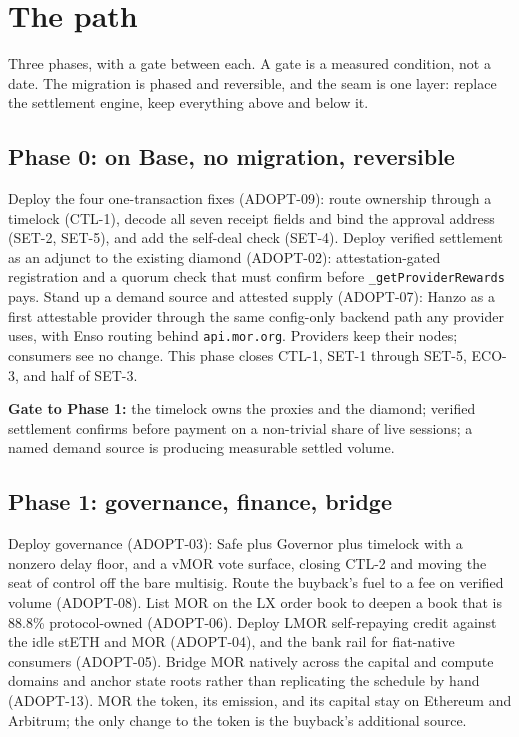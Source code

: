 \documentclass[11pt,a4paper]{article}
\newcommand{\code}[1]{\texttt{\small #1}}
\begin{document}
\section{The path}
\label{sec:path}

Three phases, with a gate between each. A gate is a measured condition, not a date. The
migration is phased and reversible, and the seam is one layer: replace the settlement engine,
keep everything above and below it.

\subsection{Phase 0: on Base, no migration, reversible}

Deploy the four one-transaction fixes (ADOPT-09): route ownership through a timelock (CTL-1),
decode all seven receipt fields and bind the approval address (SET-2, SET-5), and add the
self-deal check (SET-4). Deploy verified settlement as an adjunct to the existing diamond
(ADOPT-02): attestation-gated registration and a quorum check that must confirm before
\code{\_getProviderRewards} pays. Stand up a demand source and attested supply (ADOPT-07): Hanzo
as a first attestable provider through the same config-only backend path any provider uses, with
Enso routing behind \code{api.mor.org}. Providers keep their nodes; consumers see no change.
This phase closes CTL-1, SET-1 through SET-5, ECO-3, and half of SET-3.

\textbf{Gate to Phase 1:} the timelock owns the proxies and the diamond; verified settlement
confirms before payment on a non-trivial share of live sessions; a named demand source is
producing measurable settled volume.

\subsection{Phase 1: governance, finance, bridge}

Deploy governance (ADOPT-03): Safe plus Governor plus timelock with a nonzero delay floor, and a
vMOR vote surface, closing CTL-2 and moving the seat of control off the bare multisig. Route the
buyback's fuel to a fee on verified volume (ADOPT-08). List MOR on the LX order book to deepen a
book that is 88.8\% protocol-owned (ADOPT-06). Deploy LMOR self-repaying credit against the idle
stETH and MOR (ADOPT-04), and the bank rail for fiat-native consumers (ADOPT-05). Bridge MOR
natively across the capital and compute domains and anchor state roots rather than replicating
the schedule by hand (ADOPT-13). MOR the token, its emission, and its capital stay on Ethereum
and Arbitrum; the only change to the token is the buyback's additional source.
\end{document}
